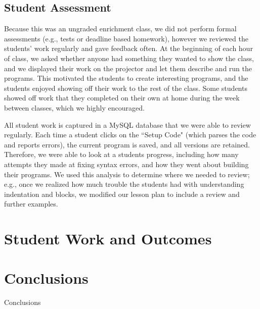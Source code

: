 \documentclass{sig-alternate}
\begin{document}
\subsection{Student Assessment}
Because this was an ungraded enrichment class, we did not perform formal assessments (e.g., tests
or deadline based homework), however we reviewed the students' work regularly and gave feedback
often.  At the beginning of each hour of class, we asked whether anyone had something they wanted
to show the class, and we displayed their work on the projector and let them describe and run the
programs.  This motivated the students to create interesting programs, and the students enjoyed
showing off their work to the rest of the class.  Some students showed off work that they completed
on their own at home during the week between classes, which we highly encouraged.

All student work is captured in a MySQL database that we were able to review regularly.  Each time
a student clicks on the ``Setup Code" (which parses the code and reports errors), the current
program is saved, and all versions are retained.  Therefore, we were able to look at a students 
progress, including how many attempts they made at fixing syntax errors, and how they went about
building their programs.  We used this analysis to determine where we needed to review; e.g.,
once we realized how much trouble the students had with understanding indentation and blocks, we
modified our lesson plan to include a review and further examples.

\section{Student Work and Outcomes}

\section{Conclusions}
Conclusions



%

%
%
\end{document}
